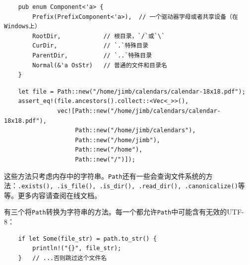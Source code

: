 \begin{verbatim}
    pub enum Component<'a> {
        Prefix(PrefixComponent<'a>),  // 一个驱动器字母或者共享设备（在Windows上）
        RootDir,            // 根目录，`/`或`\`
        CurDir,             // `.`特殊目录
        ParentDir,          // `..`特殊目录
        Normal(&'a OsStr)   // 普通的文件和目录名
    }
\end{verbatim}

\begin{verbatim}
    let file = Path::new("/home/jimb/calendars/calendar-18x18.pdf");
    assert_eq!(file.ancestors().collect::<Vec<_>>(),
               vec![Path::new("/home/jimb/calendars/calendar-18x18.pdf"),
                    Path::new("/home/jimb/calendars"),
                    Path::new("/home/jimb"),
                    Path::new("/home"),
                    Path::new("/")]);
\end{verbatim}

这些方法只考虑内存中的字符串。\texttt{Path}还有一些会查询文件系统的方法：\texttt{.exists(), .is\_file(), .is\_dir(), .read\_dir(), .canonicalize()}等等。更多内容请查阅在线文档。

有三个将\texttt{Path}转换为字符串的方法。每一个都允许\texttt{Path}中可能含有无效的UTF-8：
\begin{verbatim}
    if let Some(file_str) = path.to_str() {
        println!("{}", file_str);
    }   // ...否则跳过这个文件名
\end{verbatim}

